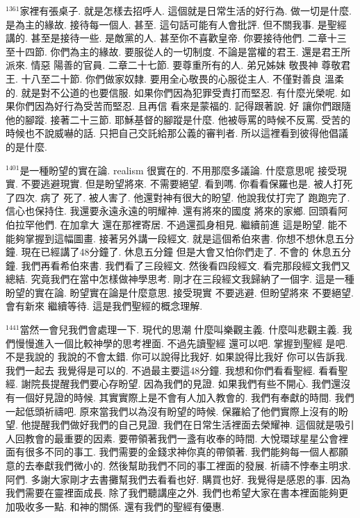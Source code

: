\documentclass{book}
\begin{document}
$^{1361}$家裡有張桌子.
就是怎樣去招呼人.
這個就是日常生活的好行為.
做一切是什麼.
是為主的緣故.
接待每一個人.
甚至.
這句話可能有人會批評.
但不關我事.
是聖經講的.
甚至是接待一些.
是敵黨的人.
甚至你不喜歡皇帝.
你要接待他們.
二章十三至十四節.
你們為主的緣故.
要服從人的一切制度.
不論是當權的君王.
還是君王所派來.
情惡 陽善的官員.
二章二十七節.
要尊重所有的人.
弟兄姊妹 敬畏神 尊敬君王.
十八至二十節.
你們做家奴隸.
要用全心敬畏的心服從主人.
不僅對善良 溫柔的.
就是對不公道的也要信服.
如果你們因為犯罪受責打而堅忍.
有什麼光榮呢.
如果你們因為好行為受苦而堅忍.
且再信 看來是蒙福的.
記得跟著說.
好 讓你們跟隨他的腳蹤.
接著二十三節.
耶穌基督的腳蹤是什麼.
他被辱罵的時候不反罵.
受苦的時候也不說威嚇的話.
只把自己交託給那公義的審判者.
所以這裡看到彼得他倡議的是什麼.

$^{1401}$是一種盼望的實在論.
realism 很實在的.
不用那麼多議論.
什麼意思呢 接受現實.
不要逃避現實.
但是盼望將來.
不需要絕望.
看到嗎.
你看看保羅也是.
被人打死了四次.
病了 死了.
被人害了.
他還對神有很大的盼望.
他說我仗打完了 跑跑完了.
信心也保持住.
我還要永遠永遠的明耀神.
還有將來的國度 將來的家鄉.
回頭看阿伯拉罕他們.
在加拿大 還在那裡寄居.
不過還孤身相見.
繼續前進 這是盼望.
能不能夠掌握到這幅圖畫.
接著另外講一段經文.
就是這個希伯來書.
你想不想休息五分鐘.
現在已經講了48分鐘了.
休息五分鐘 但是大會又怕你們走了.
不會的 休息五分鐘.
我們再看希伯來書.
我們看了三段經文.
然後看四段經文.
看完那段經文我們又總結.
究竟我們在當中怎樣做神學思考.
剛才在三段經文我歸納了一個字.
這是一種盼望的實在論.
盼望實在論是什麼意思.
接受現實 不要逃避.
但盼望將來 不要絕望.
會有新來 繼續等待.
這是我們聖經的概念理解.

$^{1441}$當然一會兒我們會處理一下.
現代的思潮 什麼叫樂觀主義.
什麼叫悲觀主義.
我們慢慢進入一個比較神學的思考裡面.
不過先讀聖經 還可以吧.
掌握到聖經 是吧.
不是我說的 我說的不會太錯.
你可以說得比我好.
如果說得比我好 你可以告訴我.
我們一起去 我覺得是可以的.
不過最主要這48分鐘.
我想和你們看看聖經.
看看聖經.
謝院長提醒我們要心存盼望.
因為我們的見證.
如果我們有些不開心.
我們還沒有一個好見證的時候.
其實實際上是不會有人加入教會的.
我們有奉獻的時間.
我們一起低頭祈禱吧.
原來當我們以為沒有盼望的時候.
保羅給了他們實際上沒有的盼望.
他提醒我們做好我們的自己見證.
我們在日常生活裡面去榮耀神.
這個就是吸引人回教會的最重要的因素.
要帶領著我們一盞有收奉的時間.
大悅環球星星公會裡面有很多不同的事工.
我們需要的金錢求神你真的帶領著.
我們能夠每一個人都願意的去奉獻我們微小的.
然後幫助我們不同的事工裡面的發展.
祈禱不悖奉主明求.
阿們.
多謝大家剛才去書攤幫我們去看看也好.
購買也好.
我覺得是感恩的事.
因為我們需要在靈裡面成長.
除了我們聽講座之外.
我們也希望大家在書本裡面能夠更加吸收多一點.
和神的關係.
還有我們的聖經有優惠.
\end{document}
